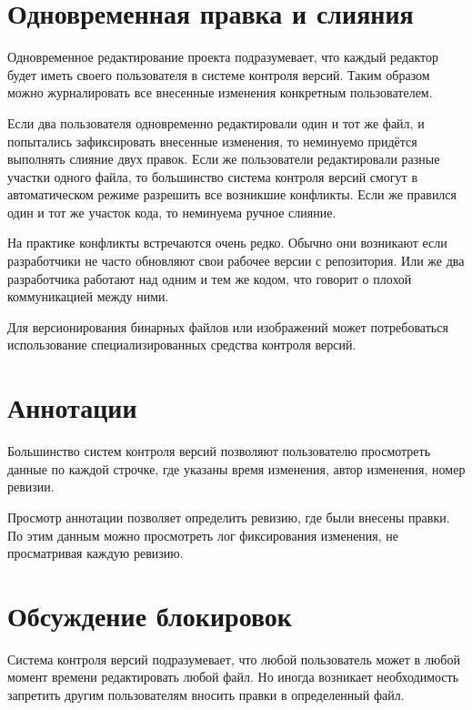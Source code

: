 
\section{ Одновременная правка и слияния } \label{sect3_7}

Одновременное редактирование проекта подразумевает, что каждый редактор будет иметь своего пользователя в системе контроля версий. Таким образом можно журналировать все внесенные изменения конкретным пользователем.

Если два пользователя одновременно редактировали один и тот же файл, и попытались зафиксировать внесенные изменения, то неминуемо придётся выполнять слияние двух правок. Если же пользователи редактировали разные участки одного файла, то большинство система контроля версий смогут в автоматическом режиме разрешить все возникшие конфликты. Если же правился один и тот же участок кода, то неминуема ручное слияние.

На практике конфликты встречаются очень редко. Обычно они возникают если разработчики не часто обновляют свои рабочее версии с репозитория. Или же два разработчика работают над одним и тем же кодом, что говорит о плохой коммуникацией между ними.

Для версионирования бинарных файлов или изображений может потребоваться использование специализированных средства контроля версий.

\section{ Аннотации } \label{sect3_7}

Большинство систем контроля версий позволяют пользователю просмотреть данные по каждой строчке, где указаны время изменения, автор изменения, номер ревизии.


Просмотр аннотации позволяет определить ревизию, где были внесены правки. По этим данным можно просмотреть лог фиксирования изменения, не просматривая каждую ревизию.

\section{ Обсуждение блокировок } \label{sect3_7}

Система контроля версий подразумевает, что любой пользователь может в любой момент времени редактировать любой файл. Но иногда возникает необходимость запретить другим пользователям вносить правки в определенный файл.




















\clearpage


